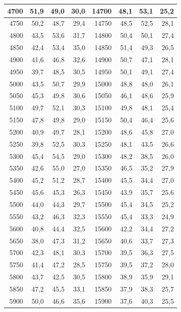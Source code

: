 \begin{small}
\begin{longtable}{|r|r|r|r|r|r|r|r|}
4700 & 51,9 & 49,0 & 30,0 & 14700 & 48,1 & 53,1 & 25,2 \\ \hline
4750 & 50,2 & 48,7 & 29,4 & 14750 & 48,5 & 52,5 & 28,1 \\ \hline
4800 & 43,5 & 53,6 & 31,7 & 14800 & 50,4 & 50,1 & 27,4 \\ \hline
4850 & 42,4 & 53,4 & 35,0 & 14850 & 51,4 & 49,3 & 26,5 \\ \hline
4900 & 41,6 & 46,8 & 32,6 & 14900 & 50,7 & 47,1 & 28,1 \\ \hline
4950 & 39,7 & 48,5 & 30,5 & 14950 & 50,1 & 49,1 & 27,4 \\ \hline
5000 & 43,5 & 50,7 & 29,9 & 15000 & 48,8 & 48,0 & 26,1 \\ \hline
5050 & 45,3 & 49,8 & 30,6 & 15050 & 46,1 & 48,6 & 25,9 \\ \hline
5100 & 49,7 & 52,1 & 30,3 & 15100 & 49,8 & 48,1 & 25,4 \\ \hline
5150 & 47,8 & 49,8 & 29,0 & 15150 & 50,4 & 46,4 & 25,6 \\ \hline
5200 & 40,9 & 49,7 & 28,1 & 15200 & 48,6 & 45,8 & 27,0 \\ \hline
5250 & 39,8 & 52,5 & 30,3 & 15250 & 48,1 & 43,5 & 26,6 \\ \hline
5300 & 45,4 & 54,5 & 29,0 & 15300 & 48,2 & 38,5 & 26,0 \\ \hline
5350 & 42,6 & 55,0 & 27,0 & 15350 & 46,5 & 35,2 & 27,9 \\ \hline
5400 & 45,2 & 51,2 & 28,7 & 15400 & 45,5 & 34,4 & 27,0 \\ \hline
5450 & 45,6 & 45,3 & 26,3 & 15450 & 43,9 & 35,7 & 25,6 \\ \hline
5500 & 44,0 & 44,3 & 29,7 & 15500 & 45,4 & 34,5 & 25,2 \\ \hline
5550 & 43,2 & 46,3 & 32,3 & 15550 & 45,4 & 33,3 & 24,9 \\ \hline
5600 & 40,8 & 44,4 & 32,5 & 15600 & 42,2 & 34,4 & 27,2 \\ \hline
5650 & 38,0 & 47,3 & 31,2 & 15650 & 40,6 & 33,7 & 27,3 \\ \hline
5700 & 42,3 & 48,1 & 30,3 & 15700 & 39,5 & 36,3 & 27,5 \\ \hline
5750 & 41,4 & 47,2 & 28,5 & 15750 & 39,5 & 37,2 & 28,0 \\ \hline
5800 & 43,7 & 42,5 & 30,5 & 15800 & 38,9 & 35,9 & 29,1 \\ \hline
5850 & 47,2 & 45,5 & 33,1 & 15850 & 37,9 & 38,3 & 25,7 \\ \hline
5900 & 50,0 & 46,6 & 35,6 & 15900 & 37,6 & 40,3 & 25,5 \\ \hline

\end{longtable}
\end{small}

